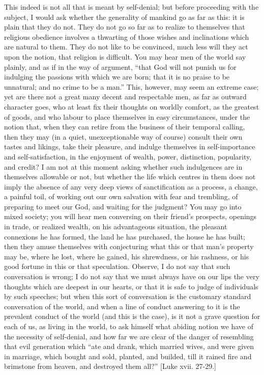 This indeed is not all that is meant by self-denial; but before
proceeding with the subject, I would ask whether the generality of
mankind go as far as this: it is plain that they do not. They do not
go so far as to realize to themselves that religious obedience
involves a thwarting of those wishes and inclinations which are
natural to them. They do not like to be convinced, much less will they
act upon the notion, that religion is difficult. You may hear men of
the world say plainly, and as if in the way of argument, ``that
God will not punish us for indulging the passions with which we are
born; that it is no praise to be unnatural; and no crime to be a
man.'' This, however, may seem an extreme case; yet are there not
a great many decent and respectable men, as far as outward character
goes, who at least fix their thoughts on worldly comfort, as the
greatest of goods, and who labour to place themselves in easy
circumstances, under the notion that, when they can retire from the
business of their temporal calling, then they may (in a quiet,
unexceptionable way of course) consult their own tastes and likings,
take their pleasure, and indulge themselves in self-importance and
self-satisfaction, in the enjoyment of wealth, power, distinction,
popularity, and credit? I am not at this moment asking whether such
indulgences are in themselves allowable or not, but whether the life
which centres in them does not imply the absence of any very deep
views of sanctification as a process, a change, a painful toil, of
working out our own salvation with fear and trembling, of preparing to
meet our God, and waiting for the judgment? You may go into mixed
society; you will hear men conversing on their friend's prospects,
openings in trade, or realized wealth, on his advantageous situation,
the pleasant connexions he has formed, the land he has purchased, the
house he has built; then they amuse themselves with conjecturing what
this or that man's property may be, where he lost, where he gained,
his shrewdness, or his rashness, or his good fortune in this or that
speculation. Observe, I do not say that such conversation is wrong; I
do not say that we must always have on our lips the very thoughts
which are deepest in our hearts, or that it is safe to judge of
individuals by such speeches; but when this sort of conversation is
the customary standard conversation of the world, and when a line of
conduct answering to it is the prevalent conduct of the world (and
this is the case), is it not a grave question for each of us, as
living in the world, to ask himself what abiding notion we have of the
necessity of self-denial, and how far we are clear of the danger of
resembling that evil generation which ``ate and drank, which
married wives, and were given in marriage, which bought and sold,
planted, and builded, till it rained fire and brimstone from heaven,
and destroyed them all?'' [Luke xvii. 27-29.]

